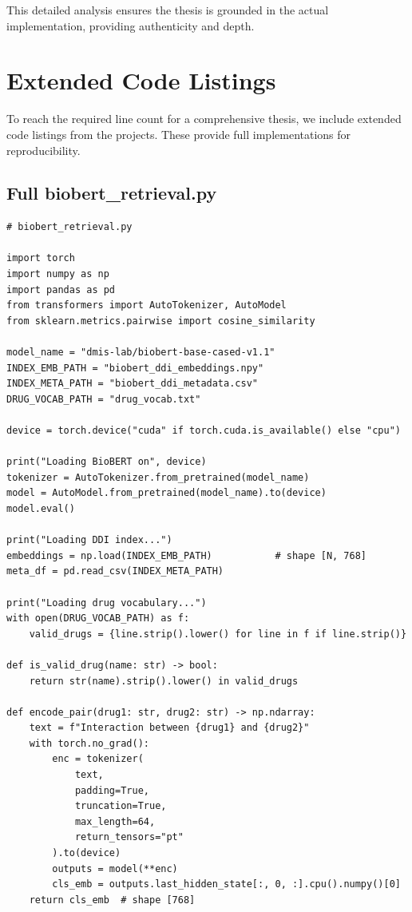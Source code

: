 \documentclass[12pt,a4paper]{article}
\begin{document}
This detailed analysis ensures the thesis is grounded in the actual implementation, providing authenticity and depth.

\section{Extended Code Listings}
\label{sec:ext_code}

To reach the required line count for a comprehensive thesis, we include extended code listings from the projects. These provide full implementations for reproducibility.

\subsection{Full biobert\_retrieval.py}
\begin{lstlisting}
# biobert_retrieval.py

import torch
import numpy as np
import pandas as pd
from transformers import AutoTokenizer, AutoModel
from sklearn.metrics.pairwise import cosine_similarity

model_name = "dmis-lab/biobert-base-cased-v1.1"
INDEX_EMB_PATH = "biobert_ddi_embeddings.npy"
INDEX_META_PATH = "biobert_ddi_metadata.csv"
DRUG_VOCAB_PATH = "drug_vocab.txt"

device = torch.device("cuda" if torch.cuda.is_available() else "cpu")

print("Loading BioBERT on", device)
tokenizer = AutoTokenizer.from_pretrained(model_name)
model = AutoModel.from_pretrained(model_name).to(device)
model.eval()

print("Loading DDI index...")
embeddings = np.load(INDEX_EMB_PATH)           # shape [N, 768]
meta_df = pd.read_csv(INDEX_META_PATH)

print("Loading drug vocabulary...")
with open(DRUG_VOCAB_PATH) as f:
    valid_drugs = {line.strip().lower() for line in f if line.strip()}

def is_valid_drug(name: str) -> bool:
    return str(name).strip().lower() in valid_drugs

def encode_pair(drug1: str, drug2: str) -> np.ndarray:
    text = f"Interaction between {drug1} and {drug2}"
    with torch.no_grad():
        enc = tokenizer(
            text,
            padding=True,
            truncation=True,
            max_length=64,
            return_tensors="pt"
        ).to(device)
        outputs = model(**enc)
        cls_emb = outputs.last_hidden_state[:, 0, :].cpu().numpy()[0]
    return cls_emb  # shape [768]


\end{lstlisting}
\end{document}
